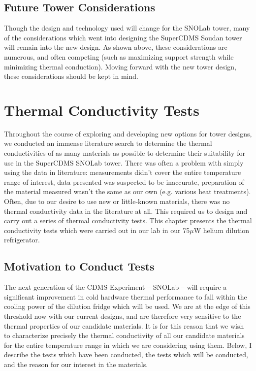 \documentclass{report}
\begin{document}
\section{Future Tower Considerations}
Though the design and technology used will change for the SNOLab tower, many of the considerations which went into designing the SuperCDMS Soudan tower will remain into the new design. As shown above, these considerations are numerous, and often competing (such as maximizing support strength while minimizing thermal conduction). Moving forward with the new tower design, these considerations should be kept in mind.



\chapter{Thermal Conductivity Tests}

Throughout the course of exploring and developing new options for tower designs, we conducted an immense literature search to determine the thermal conductivities of as many materials as possible to determine their suitability for use in the SuperCDMS SNOLab tower. There was often a problem with simply using the data in literature: measurements didn't cover the entire temperature range of interest, data presented was suspected to be inaccurate, preparation of the material measured wasn't the same as our own (e.g. various heat treatments). Often, due to our desire to use new or little-known materials, there was no thermal conductivity data in the literature at all. This required us to design and carry out a series of thermal conductivity tests. This chapter presents the thermal conductivity tests which were carried out in our lab in our 75$\mu$W helium dilution refrigerator.

\section{Motivation to Conduct Tests}
The next generation of the CDMS Experiment -- SNOLab -- will require a significant improvement in cold hardware thermal performance to fall within the cooling power of the dilution fridge which will be used. We are at the edge of this threshold now with our current designs, and are therefore very sensitive to the thermal properties of our candidate materials. It is for this reason that we wish to characterize precisely the thermal conductivity of all our candidate materials for the entire temperature range in which we are considering using them. Below, I describe the tests which have been conducted, the tests which will be conducted, and the reason for our interest in the materials.
\end{document}
